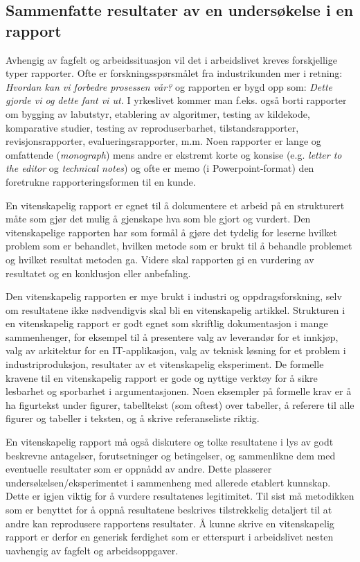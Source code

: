 \documentclass{article}
\begin{document}
\subsection{Sammenfatte resultater av en undersøkelse i en rapport}
Avhengig av fagfelt og arbeidssituasjon vil det i arbeidslivet kreves forskjellige typer rapporter. Ofte er forskningsspørsmålet fra industrikunden mer i retning: {\em Hvordan kan vi forbedre prosessen vår?}  og rapporten er bygd opp som: {\em Dette gjorde vi og dette fant vi ut.}  I yrkeslivet kommer man f.eks. også borti rapporter om bygging av labutstyr, etablering av algoritmer, testing av kildekode, komparative studier, testing av reproduserbarhet, tilstandsrapporter, revisjonsrapporter, evalueringsrapporter, m.m. Noen rapporter er lange og omfattende (\emph{monograph}) mens andre er ekstremt korte og konsise (e.g. \emph{letter to the editor} og \emph{technical notes}) og ofte er memo (i Powerpoint-format) den foretrukne rapporteringsformen til en kunde.

En vitenskapelig rapport er egnet til å dokumentere et arbeid på en strukturert måte som gjør det mulig å gjenskape hva som ble gjort og vurdert.
Den vitenskapelige rapporten har som formål å gjøre det tydelig for leserne hvilket problem som er behandlet, hvilken metode som er brukt til å behandle problemet og hvilket resultat metoden ga.
Videre skal rapporten gi en vurdering av resultatet og en konklusjon eller anbefaling.

Den vitenskapelig rapporten er mye brukt i industri og oppdragsforskning, selv om resultatene ikke nødvendigvis skal bli en vitenskapelig artikkel.
Strukturen i en vitenskapelig rapport er godt egnet som skriftlig dokumentasjon i mange sammenhenger, for eksempel til å presentere valg av leverandør for et innkjøp, valg av arkitektur for en IT-applikasjon, valg av teknisk løsning for et problem i industriproduksjon, resultater av et vitenskapelig eksperiment.
De formelle kravene til en vitenskapelig rapport er gode og nyttige verktøy for å sikre lesbarhet og sporbarhet i argumentasjonen.
Noen eksempler på formelle krav er å ha figurtekst under figurer, tabelltekst (som oftest) over tabeller, å referere til alle figurer og tabeller i teksten, og å skrive referanseliste riktig.

En vitenskapelig rapport må også diskutere og tolke resultatene i lys av godt beskrevne antagelser, forutsetninger og betingelser, og sammenlikne dem med eventuelle resultater som er oppnådd av andre.
Dette plasserer undersøkelsen/eksperimentet i sammenheng med allerede etablert kunnskap.
Dette er igjen viktig for å vurdere resultatenes legitimitet.
Til sist må metodikken som er benyttet for å oppnå resultatene beskrives tilstrekkelig detaljert til at andre kan reprodusere rapportens resultater.
Å kunne skrive en vitenskapelig rapport er derfor en generisk ferdighet som er etterspurt i arbeidslivet nesten uavhengig av fagfelt og arbeidsoppgaver.
\end{document}
